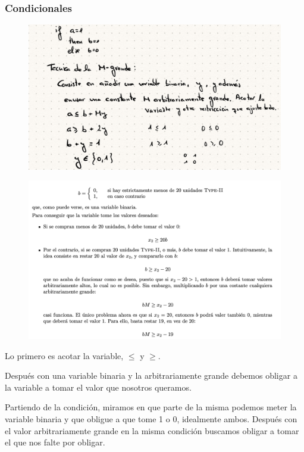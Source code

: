 \documentclass[12pt, twoside, openright]{report} %
\begin{document}
\subsubsection{Condicionales}
\begin{figure}[H]
	{\includegraphics[scale=.25]{Untitled 17.png}}
\end{figure}
\begin{figure}[H]
	{\includegraphics[scale=.6]{Screenshot_2020-11-02_at_14.40.37.png}}
\end{figure}
Lo primero es acotar la variable, $\leq$ y $\geq$.

Después con una variable binaria y la arbitrariamente grande debemos
obligar a la variable a tomar el valor que nosotros queramos.

Partiendo de la condición, miramos en que parte de la misma podemos
meter la variable binaria y que obligue a que tome 1 o 0, idealmente
ambos. Después con el valor arbitrariamente grande en la misma
condición buscamos obligar a tomar el que nos falte por obligar.
\end{document}
